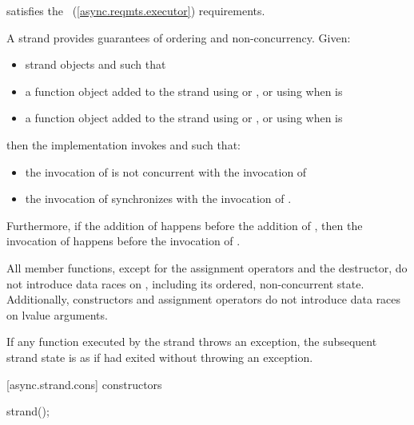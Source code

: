 \pnum
{} satisfies the ~(\ref{async.reqmts.executor}) requirements.

\pnum
 A strand provides guarantees of ordering and non-concurrency. Given:

\begin{itemize}
\item
strand objects  and  such that 

\item
a function object  added to the strand  using  or , or using  when  is 

\item
a function object  added to the strand  using  or , or using  when  is 
\end{itemize}

\pnum
then the implementation invokes  and  such that:

\begin{itemize}
\item
the invocation of  is not concurrent with the invocation of 

\item
the invocation of  synchronizes with the invocation of .
\end{itemize}

\pnum
Furthermore, if the addition of  happens before the addition of , then the invocation of  happens before the invocation of .

\pnum
All member functions, except for the assignment operators and the destructor, do not introduce data races on , including its ordered, non-concurrent state. Additionally, constructors and assignment operators do not introduce data races on lvalue arguments.

\pnum
If any function  executed by the strand throws an exception, the subsequent strand state is as if  had exited without throwing an exception.


[async.strand.cons]{ constructors}

%
\begin{itemdecl}
strand();
\end{itemdecl}

